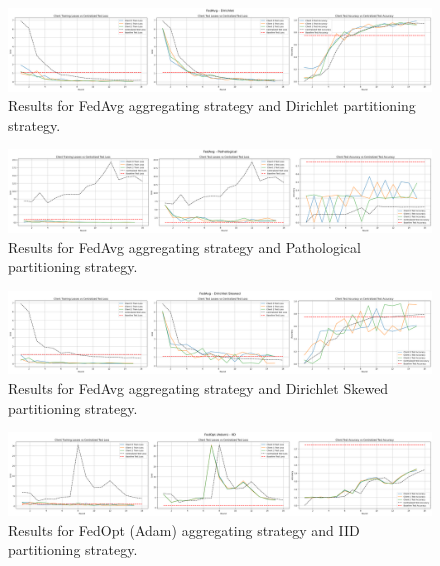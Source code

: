 \documentclass[11pt]{article}
\begin{document}
    \begin{figure}[h!]
        \centering
        \includegraphics[width=1\linewidth]{img/experiment_2/fedavg-dirichlet}
        \caption{Results for FedAvg aggregating strategy and Dirichlet partitioning strategy.}
        \label{fig:exp2-fedavg-dirichlet}
    \end{figure}

    \begin{figure}[h!]
        \centering
        \includegraphics[width=1\linewidth]{img/experiment_2/fedavg-pathological}
        \caption{Results for FedAvg aggregating strategy and Pathological partitioning strategy.}
        \label{fig:exp2-fedavg-pathological}
    \end{figure}

    \begin{figure}[h!]
        \centering
        \includegraphics[width=1\linewidth]{img/experiment_2/fedavg-dirichlet-skewed}
        \caption{Results for FedAvg aggregating strategy and Dirichlet Skewed partitioning strategy.}
        \label{fig:exp2-fedavg-dirichlet-skewed}
    \end{figure}

    \begin{figure}[h!]
        \centering
        \includegraphics[width=1\linewidth]{img/experiment_2/fedopt-iid}
        \caption{Results for FedOpt (Adam) aggregating strategy and IID partitioning strategy.}
        \label{fig:exp2-fedopt-iid}
    \end{figure}
\end{document}
